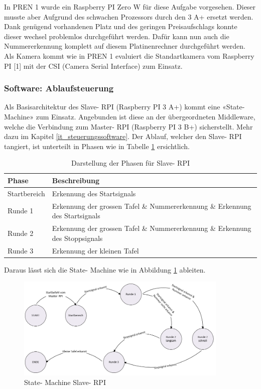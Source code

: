 \documentclass[../../main.tex]{subfiles}
\begin{document}
In PREN 1 wurde ein Raspberry PI Zero W für diese Aufgabe vorgesehen. Dieser musste aber Aufgrund des schwachen Prozessors durch den 3 A+ ersetzt werden. Dank genügend vorhandenen Platz und des geringen Preisaufschlags konnte dieser wechsel problemlos durchgeführt werden. Dafür kann nun auch die Nummererkennung komplett auf diesem Platinenrechner durchgeführt werden. Als Kamera kommt wie in PREN 1 evaluiert die Standartkamera vom Raspberry PI [1] mit der CSI (Camera Serial Interface) zum Einsatz.

\subsubsection{Software: Ablaufsteuerung}
Als Basisarchitektur des Slave- RPI (Raspberry PI 3 A+) kommt eine «State- Machine» zum Einsatz. Angebunden ist diese an der übergeordneten Middleware, welche die Verbindung zum Master- RPI (Raspberry PI 3 B+) sicherstellt. Mehr dazu im Kapitel \ref{it_steuerungssoftware}. Der Ablauf, welcher den Slave- RPI tangiert, ist unterteilt in Phasen wie in Tabelle \ref{tab:Phasentabelle} ersichtlich.

\begin{table}[H] %
  \begin{flushleft}
      \begin{tabular}{ | p{3cm} | p{10.5cm} |}
          \hline
          \textbf{Phase}  & \textbf{Beschreibung} \\\hline
          Startbereich & Erkennung des Startsignals \\\hline
          Runde 1      & Erkennung der grossen Tafel \& Nummererkennung \&  Erkennung des Startsignals \\\hline
          Runde 2      & Erkennung der grossen Tafel \& Nummererkennung \& Erkennung des Stoppsignals \\\hline
          Runde 3      & Erkennung der kleinen Tafel \\\hline
      \end{tabular}
  \end{flushleft}
  \caption{Darstellung der Phasen für Slave- RPI}
  \label{tab:Phasentabelle}
\end{table}

Daraus lässt sich die State- Machine wie in Abbildung \ref{fig:state-machine} ableiten.
\vspace{1cm}

\begin{figure}[H] %
  \centering
  \includegraphics[width=0.9\textwidth]{state-machine.png}
  \caption{State- Machine Slave- RPI}
  \label{fig:state-machine}
\end{figure}
\end{document}
